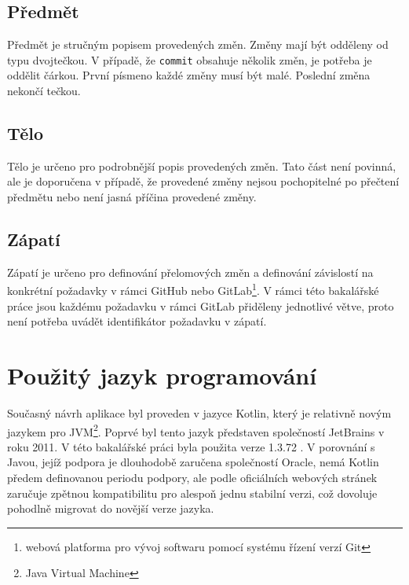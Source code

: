     \subsection{Předmět}
        Předmět je stručným popisem provedených změn. Změny mají být odděleny od typu dvojtečkou. V případě, že \verb|commit| obsahuje několik změn, je potřeba je oddělit čárkou. První písmeno každé změny musí být malé. Poslední změna nekončí tečkou.
    
    \subsection{Tělo}
        Tělo je určeno pro podrobnější popis provedených změn. Tato část není povinná, ale je doporučena v případě, že provedené změny nejsou pochopitelné po přečtení předmětu nebo není jasná příčina provedené změny.
    
    \subsection{Zápatí}
        Zápatí je určeno pro definování přelomových změn a definování závislostí na konkrétní požadavky v rámci GitHub nebo GitLab\footnote{webová platforma pro vývoj softwaru pomocí systému řízení verzí Git}. V rámci této bakalářské práce jsou každému požadavku v rámci GitLab přiděleny jednotlivé větve, proto není potřeba uvádět identifikátor požadavku v zápatí.
    
\section{Použitý jazyk programování}\label{resere:kotlin}
    Současný návrh aplikace byl proveden v jazyce Kotlin, který je relativně novým jazykem pro JVM\footnote{Java Virtual Machine}. Poprvé byl tento jazyk představen společností JetBrains v roku 2011. V této bakalářské práci byla použita verze 1.3.72 . V porovnání s Javou, jejíž podpora je dlouhodobě zaručena společností Oracle, nemá Kotlin předem definovanou periodu podpory, ale podle oficiálních webových stránek zaručuje zpětnou kompatibilitu pro alespoň jednu stabilní verzi, což dovoluje pohodlně migrovat do novější verze jazyka\cite{java-support-period}\cite{kotlin-compatibility}.
    
    
